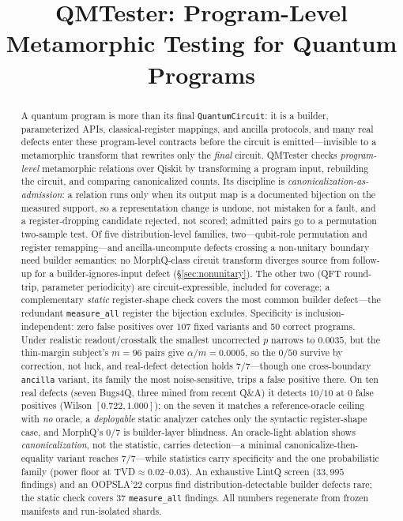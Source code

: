 \documentclass[10pt,conference]{IEEEtran}
\title{QMTester: Program-Level Metamorphic Testing for Quantum Programs}
\author{\IEEEauthorblockN{Anonymous Submission}}
\begin{document}

\maketitle

\begin{abstract}
A quantum program is more than its final \texttt{QuantumCircuit}: it is a builder, parameterized APIs, classical-register mappings, and ancilla protocols, and many real defects enter these program-level contracts before the circuit is emitted---invisible to a metamorphic transform that rewrites only the \emph{final} circuit. QMTester checks \emph{program-level} metamorphic relations over Qiskit by transforming a program input, rebuilding the circuit, and comparing canonicalized counts. Its discipline is \emph{canonicalization-as-admission}: a relation runs only when its output map is a documented bijection on the measured support, so a representation change is undone, not mistaken for a fault, and a register-dropping candidate rejected, not scored; admitted pairs go to a permutation two-sample test. Of five distribution-level families, two---qubit-role permutation and register remapping---and ancilla-uncompute defects crossing a non-unitary boundary need builder semantics: no MorphQ-class circuit transform diverges source from follow-up for a builder-ignores-input defect (\S\ref{sec:nonunitary}). The other two (QFT round-trip, parameter periodicity) are circuit-expressible, included for coverage; a complementary \emph{static} register-shape check covers the most common builder defect---the redundant \texttt{measure\_all} register the bijection excludes. Specificity is inclusion-independent: zero false positives over 107 fixed variants and 50 correct programs. Under realistic readout/crosstalk the smallest uncorrected $p$ narrows to $0.0035$, but the thin-margin subject's $m{=}96$ pairs give $\alpha/m{=}0.0005$, so the $0/50$ survive by correction, not luck, and real-defect detection holds $7/7$---though one cross-boundary \texttt{ancilla} variant, its family the most noise-sensitive, trips a false positive there. On ten real defects (seven Bugs4Q, three mined from recent Q\&A) it detects $10/10$ at $0$ false positives (Wilson $[0.722,1.000]$); on the seven it matches a reference-oracle ceiling with \emph{no} oracle, a \emph{deployable} static analyzer catches only the syntactic register-shape case, and MorphQ's $0/7$ is builder-layer blindness. An oracle-light ablation shows \emph{canonicalization}, not the statistic, carries detection---a minimal canonicalize-then-equality variant reaches $7/7$---while statistics carry specificity and the one probabilistic family (power floor at TVD$\approx0.02$--$0.03$). An exhaustive LintQ screen ($33{,}995$ findings) and an OOPSLA'22 corpus find distribution-detectable builder defects rare; the static check covers $37$ \texttt{measure\_all} findings. All numbers regenerate from frozen manifests and run-isolated shards.
\end{abstract}
\end{document}
